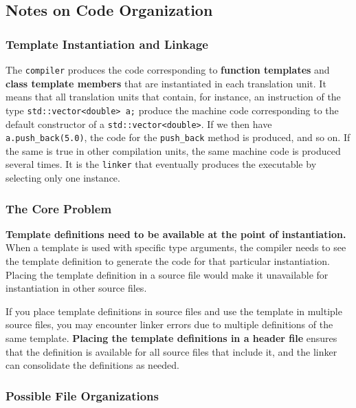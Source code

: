 \subsection{Notes on Code Organization}

\subsubsection{Template Instantiation and Linkage}

The \texttt{compiler} produces the code corresponding to \textbf{function templates} and \textbf{class template members} that are instantiated in each translation unit. It means that all translation units that contain, for instance, an instruction of the type \texttt{std::vector<double> a;} produce the machine code corresponding to the default constructor of a \texttt{std::vector<double>}. If we then have \texttt{a.push\_back(5.0)}, the code for the \texttt{push\_back} method is produced, and so on. If the same is true in other compilation units, the same machine code is produced several times. It is the \texttt{linker} that eventually produces the executable by selecting only one instance.

\subsubsection{The Core Problem}
\textbf{Template definitions need to be available at the point of instantiation.} When a template is used with specific type arguments, the compiler needs to see the template definition to generate the code for that particular instantiation. Placing the template definition in a source file would make it unavailable for instantiation in other source files.

If you place template definitions in source files and use the template in multiple source files, you may encounter linker errors due to multiple definitions of the same template. \textbf{Placing the template definitions in a header file} ensures that the definition is available for all source files that include it, and the linker can consolidate the definitions as needed.

\subsubsection{Possible File Organizations}

